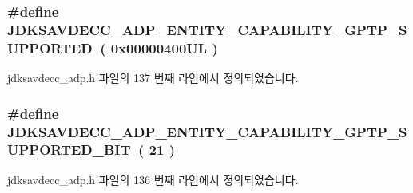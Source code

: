 \subsubsection[{\texorpdfstring{J\+D\+K\+S\+A\+V\+D\+E\+C\+C\+\_\+\+A\+D\+P\+\_\+\+E\+N\+T\+I\+T\+Y\+\_\+\+C\+A\+P\+A\+B\+I\+L\+I\+T\+Y\+\_\+\+G\+P\+T\+P\+\_\+\+S\+U\+P\+P\+O\+R\+T\+ED}{JDKSAVDECC_ADP_ENTITY_CAPABILITY_GPTP_SUPPORTED}}]{\setlength{\rightskip}{0pt plus 5cm}\#define J\+D\+K\+S\+A\+V\+D\+E\+C\+C\+\_\+\+A\+D\+P\+\_\+\+E\+N\+T\+I\+T\+Y\+\_\+\+C\+A\+P\+A\+B\+I\+L\+I\+T\+Y\+\_\+\+G\+P\+T\+P\+\_\+\+S\+U\+P\+P\+O\+R\+T\+ED~( 0x00000400\+U\+L )}\hypertarget{group__adp__entity__capability_gaf39226a31d10f4cb12894e5c4b7ac324}{}\label{group__adp__entity__capability_gaf39226a31d10f4cb12894e5c4b7ac324}


jdksavdecc\+\_\+adp.\+h 파일의 137 번째 라인에서 정의되었습니다.

\subsubsection[{\texorpdfstring{J\+D\+K\+S\+A\+V\+D\+E\+C\+C\+\_\+\+A\+D\+P\+\_\+\+E\+N\+T\+I\+T\+Y\+\_\+\+C\+A\+P\+A\+B\+I\+L\+I\+T\+Y\+\_\+\+G\+P\+T\+P\+\_\+\+S\+U\+P\+P\+O\+R\+T\+E\+D\+\_\+\+B\+IT}{JDKSAVDECC_ADP_ENTITY_CAPABILITY_GPTP_SUPPORTED_BIT}}]{\setlength{\rightskip}{0pt plus 5cm}\#define J\+D\+K\+S\+A\+V\+D\+E\+C\+C\+\_\+\+A\+D\+P\+\_\+\+E\+N\+T\+I\+T\+Y\+\_\+\+C\+A\+P\+A\+B\+I\+L\+I\+T\+Y\+\_\+\+G\+P\+T\+P\+\_\+\+S\+U\+P\+P\+O\+R\+T\+E\+D\+\_\+\+B\+IT~( 21 )}\hypertarget{group__adp__entity__capability_ga64703efed5c25b4b2e9a74758ba11b3c}{}\label{group__adp__entity__capability_ga64703efed5c25b4b2e9a74758ba11b3c}


jdksavdecc\+\_\+adp.\+h 파일의 136 번째 라인에서 정의되었습니다.


